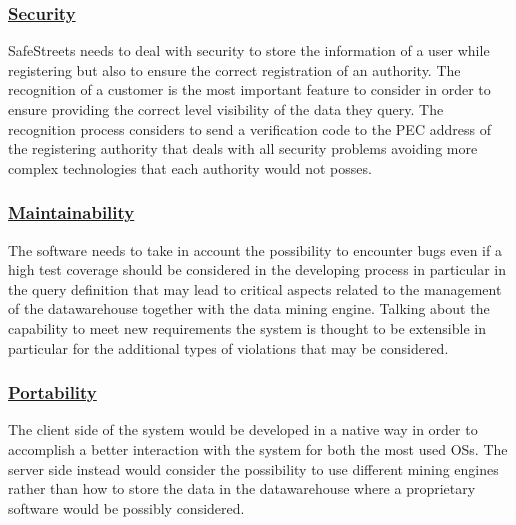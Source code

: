 		\subsubsection[Security]{\hyperlink{toc}{Security}}
			SafeStreets needs to deal with security to store the information of a user while registering but also to ensure the correct registration of an authority. The recognition of a customer is the most important feature to consider in order to ensure providing the correct level visibility of the data they query. The recognition process considers to send a verification code to the PEC address of the registering authority that deals with all security problems avoiding more complex technologies that each authority would not posses.
		\subsubsection[Maintainability]{\hyperlink{toc}{Maintainability}}
			The software needs to take in account the possibility to encounter bugs even if a high test coverage should be considered in the developing process in particular in the query definition that may lead to critical aspects related to the management of the datawarehouse together with the data mining engine. Talking about the capability to meet new requirements the system is thought to be extensible in particular for the additional types of violations that may be considered. 
		\subsubsection[Portability]{\hyperlink{toc}{Portability}}
			The client side of the system would be developed in a native way in order to accomplish a better interaction with the system for both the most used OSs. The server side instead would consider the possibility to use different mining engines rather than how to store the data in the datawarehouse where a proprietary software would be possibly considered.
